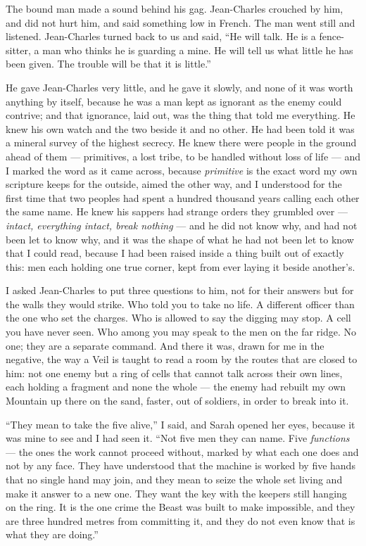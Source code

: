 The bound man made a sound behind his gag. Jean-Charles crouched by him, and did not hurt him, and said something low in French. The man went still and listened. Jean-Charles turned back to us and said, ``He will talk. He is a fence-sitter, a man who thinks he is guarding a mine. He will tell us what little he has been given. The trouble will be that it is little.''\par

He gave Jean-Charles very little, and he gave it slowly, and none of it was worth anything by itself, because he was a man kept as ignorant as the enemy could contrive; and that ignorance, laid out, was the thing that told me everything. He knew his own watch and the two beside it and no other. He had been told it was a mineral survey of the highest secrecy. He knew there were people in the ground ahead of them --- primitives, a lost tribe, to be handled without loss of life --- and I marked the word as it came across, because \emph{primitive} is the exact word my own scripture keeps for the outside, aimed the other way, and I understood for the first time that two peoples had spent a hundred thousand years calling each other the same name. He knew his sappers had strange orders they grumbled over --- \emph{intact, everything intact, break nothing} --- and he did not know why, and had not been let to know why, and it was the shape of what he had not been let to know that I could read, because I had been raised inside a thing built out of exactly this: men each holding one true corner, kept from ever laying it beside another's.

I asked Jean-Charles to put three questions to him, not for their answers but for the walls they would strike. Who told you to take no life. A different officer than the one who set the charges. Who is allowed to say the digging may stop. A cell you have never seen. Who among you may speak to the men on the far ridge. No one; they are a separate command. And there it was, drawn for me in the negative, the way a Veil is taught to read a room by the routes that are closed to him: not one enemy but a ring of cells that cannot talk across their own lines, each holding a fragment and none the whole --- the enemy had rebuilt my own Mountain up there on the sand, faster, out of soldiers, in order to break into it.\par

``They mean to take the five alive,'' I said, and Sarah opened her eyes, because it was mine to see and I had seen it. ``Not five men they can name. Five \emph{functions} --- the ones the work cannot proceed without, marked by what each one does and not by any face. They have understood that the machine is worked by five hands that no single hand may join, and they mean to seize the whole set living and make it answer to a new one. They want the key with the keepers still hanging on the ring. It is the one crime the Beast was built to make impossible, and they are three hundred metres from committing it, and they do not even know that is what they are doing.''\par

